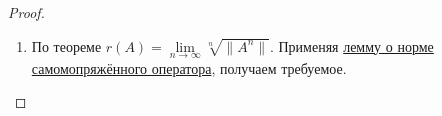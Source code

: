 \begin{proof}
\begin{enumerate}
\begin{itemize}
        Можно переписать это так:
        
        \[(A x_n, x_n) - m_+ (x_n, x_n) \to 0
        \lra
        (A_{m_+} x_n, x_n) \to 0\]

        Обозначим через $B$ оператор $(m_+ I - A)$ (он ограниченный и самосопряжённый). Понятно, что $\forall x\ (Bx, x) \geqslant 0$.

        Введём полускалярное произведение: $\angles{x, y} = (Bx, y)$ и рассмотрим $\|Bx_n\|^4$:

        \[
        \|Bx_n\|^4 = (Bx_n, Bx_n)^2 = \angles{x_n, B x_n}^2 \stackrel{\text{КБШ}}{\leqslant}  
        \underbrace{\angles{x_n, x_n}}_{=(B x_n, x_n) \to 0} 
        \cdot \underbrace{\angles{B x_n, B x_n}}_{\text{ограничена}} \to 0
        \]

        $\angles{B x_n, B x_n}$ ограничена, так как

        \[
        \angles{B x_n, B x_n} = (B^2 x_n, B x_n) \leqslant \|B^2 x_n\| \cdot \|B x_n\| \leqslant \|B^2\| \cdot \|x_n\| \cdot \|B\| \cdot \|x_n\| = \|B\|^3
        \]
    \end{itemize}
    
    \item По теореме  $r(A) = \lim\limits_{n \to \infty} \sqrt[n]{\|A^n\|}$. Применяя  \hyperref[5.4-lemma1]{лемму о норме самомопряжённого оператора}, получаем требуемое.
  \end{enumerate}
  
\end{proof}